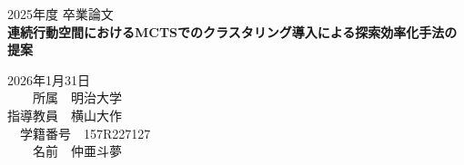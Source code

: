 \documentclass[11pt,a4j]{jreport}
\begin{document}
\thispagestyle{empty}
\begin{center}

\vspace{20mm}
{\Large\noindent 2025年度 卒業論文}\\
\vspace{40mm}
{\huge\noindent\textbf{連続行動空間におけるMCTSでのクラスタリング導入による探索効率化手法の提案
}}\\
\medskip
\vspace{60mm}

{\Large\noindent
2026年1月31日\\
\vspace{\baselineskip}
　　所属　明治大学 \\
\vspace{\baselineskip}
指導教員　横山大作    \\
\vspace{\baselineskip}
　学籍番号　157R227127\\
\vspace{\baselineskip}
　　名前　仲亜斗夢\\
}
\vspace{40mm}

\end{center}

\thispagestyle{empty}
\clearpage

\renewcommand{\abstractname}{要旨}

\begin{abstract}
デジタルカーリングは、コンピュータ上の物理シミュレータを用いた仮想的なカーリング環境であり、連続行動空間と確率的な不確定性を併せ持つ高度な戦略ゲームである。モンテカルロ木探索（MCTS）はこのようなゲームにおいて有効な手法として知られているが、連続行動空間では候補手が無限に存在するため、探索効率が著しく低下するという課題がある。

本研究では、この課題に対処するため、行動空間の離散化に加えてクラスタリングを導入し、局面に応じて動的に有効な候補手を抽出・選別する手法を提案する。具体的には、まずハウス周辺の座標をグリッド化して候補手を生成し、各候補手のシミュレーション結果に対して階層的クラスタリングを適用することで、類似した結果をもたらす候補手を統合する。これにより、MCTSの子ノード数を大幅に削減し、探索効率の向上を図る。

さらに、クラスタリングによって失われる微細な座標情報を補うため、「Zoom-In探索」を導入する。これは、MCTSによって最も有望と判断されたクラスタ内の候補手に対して集中的に再探索を行うことで、最終的な着手精度を向上させるアプローチである。

評価実験では、10種類のテストジャンルから生成した100ケースの局面を用いて、提案手法（Clustered MCTS）と全探索手法（AllGrid MCTS）を比較した。その結果、提案手法は全探索の10\%〜30\%程度の計算量で約60\%のクラスタ一致率を達成した。一方、完全一致率は約20\%に留まり、クラスタリングのみでは最適解の特定に限界があることも確認された。この結果は、Zoom-In探索による精密化の必要性を裏付けるものである。
\end{abstract}
\end{document}
